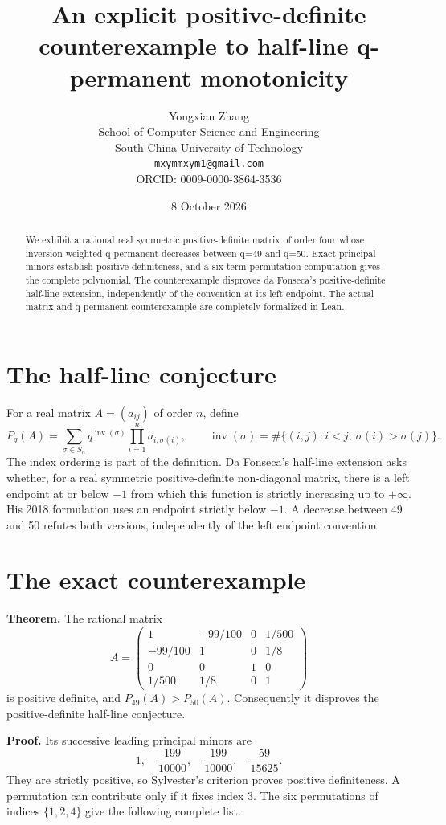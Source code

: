 \documentclass[11pt]{article}
\title{An explicit positive-definite counterexample to half-line q-permanent monotonicity}
\author{Yongxian Zhang\\[2pt]\small School of Computer Science and Engineering\\\small South China University of Technology\\\small\texttt{mxymmxym1@gmail.com}\\\small ORCID: 0009-0000-3864-3536}
\date{8 October 2026}
\begin{document}
\maketitle
\begin{abstract}We exhibit a rational real symmetric positive-definite matrix of order four whose inversion-weighted q-permanent decreases between q=49 and q=50. Exact principal minors establish positive definiteness, and a six-term permutation computation gives the complete polynomial. The counterexample disproves da Fonseca's positive-definite half-line extension, independently of the convention at its left endpoint. The actual matrix and q-permanent counterexample are completely formalized in Lean.\end{abstract}
\section{The half-line conjecture}\label{the-half-line-conjecture}

For a real matrix \(A=(a_{ij})\) of order \(n\), define \[
 P_q(A)=\sum_{\sigma\in S_n}q^{\operatorname{inv}(\sigma)}
                  \prod_{i=1}^n a_{i,\sigma(i)},\qquad
 \operatorname{inv}(\sigma)=\#\{(i,j):i<j,\ \sigma(i)>\sigma(j)\}.
\] The index ordering is part of the definition. Da Fonseca's half-line
extension asks whether, for a real symmetric positive-definite
non-diagonal matrix, there is a left endpoint at or below \(-1\) from
which this function is strictly increasing up to \(+\infty\). His 2018
formulation uses an endpoint strictly below \(-1\). A decrease between
49 and 50 refutes both versions, independently of the left endpoint
convention.

\section{The exact counterexample}\label{the-exact-counterexample}

\textbf{Theorem.} The rational matrix \[
A=\begin{pmatrix}
1&-99/100&0&1/500\\
-99/100&1&0&1/8\\
0&0&1&0\\
1/500&1/8&0&1
\end{pmatrix}
\] is positive definite, and \(P_{49}(A)>P_{50}(A)\). Consequently it
disproves the positive-definite half-line conjecture.

\textbf{Proof.} Its successive leading principal minors are \[
1,\quad\frac{199}{10000},\quad\frac{199}{10000},\quad\frac{59}{15625}.
\] They are strictly positive, so Sylvester's criterion proves positive
definiteness. A permutation can contribute only if it fixes index 3. The
six permutations of indices \(\{1,2,4\}\) give the following complete
list.
\end{document}
